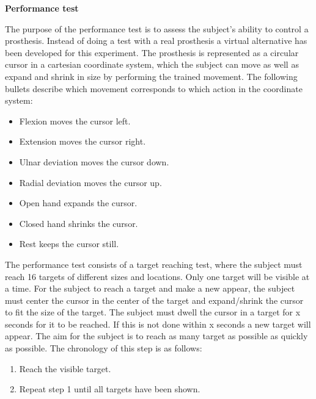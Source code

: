 \textbf{Performance test}

The purpose of the performance test is to assess the subject's ability to control a prosthesis. Instead of doing a test with a real prosthesis a virtual alternative has been developed for this experiment. The prosthesis is represented as a circular cursor in a cartesian coordinate system, which the subject can move as well as expand and shrink in size by performing the trained movement. The following bullets describe which movement corresponds to which action in the coordinate system:

\begin{itemize}
	\item Flexion moves the cursor left.
	\item Extension moves the cursor right.
	\item Ulnar deviation moves the cursor down.
	\item Radial deviation moves the cursor up.
	\item Open hand expands the cursor.
	\item Closed hand shrinks the cursor.
	\item Rest keeps the cursor still.
\end{itemize}

 The performance test consists of a target reaching test, where the subject must reach 16 targets of different sizes and locations. Only one target will be visible at a time. For the subject to reach a target and make a new appear, the subject must center the cursor in the center of the target and expand/shrink the cursor to fit the size of the target. The subject must dwell the cursor in a target for x seconds for it to be reached. If this is not done within x seconds a new target will appear. The aim for the subject is to reach as many target as possible as quickly as possible. The chronology of this step is as follows:

\begin{enumerate}
	\item Reach the visible target.
	\item Repeat step 1 until all targets have been shown.
\end{enumerate}


